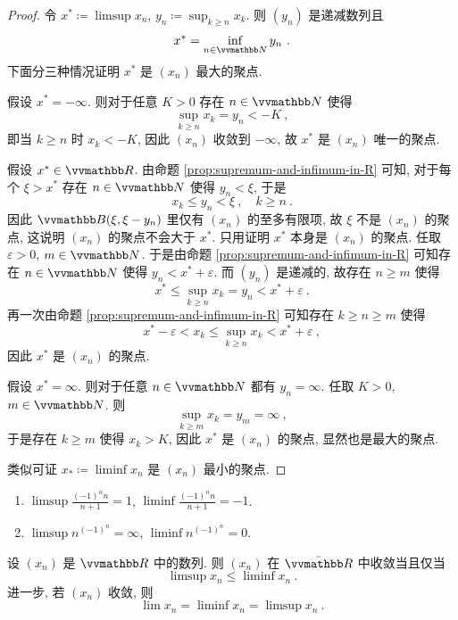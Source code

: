 \begin{proof}
    令 \(x^\ast \coloneqq \limsup x_n\), \(y_n \coloneqq \sup_{k \geq n} x_k\). 则 \((y_n)\) 是递减数列且
    \[
        x^\ast = \inf_{n \in \N} y_n\ .
    \]
    下面分三种情况证明 \(x^\ast\) 是 \((x_n)\) 最大的聚点.

    假设 \(x^\ast = - \infty\). 则对于任意 \(K > 0\) 存在 \(n \in \N\) 使得
    \[
        \sup_{k \geq n} x_k = y_n < - K\ ,
    \]
    即当 \(k \geq n\) 时 \(x_k < - K\), 因此 \((x_n)\) 收敛到 \(- \infty\), 故 \(x^\ast\) 是 \((x_n)\) 唯一的聚点.

    假设 \(x^\ast \in \R\). 由命题 \ref{prop:supremum-and-infimum-in-R} 可知, 对于每个 \(\xi > x^\ast\) 存在 \(n \in \N\) 使得 \(y_n < \xi\), 于是
    \[
        x_k \leq y_n < \xi\ ,\quad k \geq n\ .
    \]
    因此 \(\B(\xi, \xi - y_n)\) 里仅有 \((x_n)\) 的至多有限项, 故 \(\xi\) 不是 \((x_n)\) 的聚点, 这说明 \((x_n)\) 的聚点不会大于 \(x^\ast\). 只用证明 \(x^\ast\) 本身是 \((x_n)\) 的聚点. 任取 \(\varepsilon > 0\), \(m \in \N\). 于是由命题 \ref{prop:supremum-and-infimum-in-R} 可知存在 \(n \in \N\) 使得 \(y_n < x^\ast + \varepsilon\). 而 \((y_n)\) 是递减的, 故存在 \(n \geq m\) 使得
    \[
        x^\ast \leq \sup_{k \geq n} x_k = y_n < x^\ast + \varepsilon\ .
    \]
    再一次由命题 \ref{prop:supremum-and-infimum-in-R} 可知存在 \(k \geq n \geq m\) 使得
    \[
        x^\ast - \varepsilon < x_k \leq \sup_{k \geq n} x_k < x^\ast + \varepsilon\ ,
    \]
    因此 \(x^\ast\) 是 \((x_n)\) 的聚点.

    假设 \(x^\ast = \infty\). 则对于任意 \(n \in \N\) 都有 \(y_n = \infty\). 任取 \(K > 0\), \(m \in \N\). 则
    \[
        \sup_{k \geq m} x_k = y_m = \infty\ ,
    \]
    于是存在 \(k \geq m\) 使得 \(x_k > K\), 因此 \(x^\ast\) 是 \((x_n)\) 的聚点, 显然也是最大的聚点.

    类似可证 \(x_\ast \coloneqq \liminf x_n\) 是 \((x_n)\) 最小的聚点.
\end{proof}

\begin{example}
    \begin{enumerate}
        \item \(\displaystyle \limsup \frac{(- 1)^n n}{n + 1} = 1\), \(\displaystyle \liminf \frac{(- 1)^n n}{n + 1} = - 1\).
        \item \(\limsup n^{(- 1)^n} = \infty\), \(\liminf n^{(- 1)^n} = 0\).
    \end{enumerate}
\end{example}

\begin{theorem}\label{thm:limit-superior-and-inferior-with-limit}
    设 \((x_n)\) 是 \(\R\) 中的数列. 则 \((x_n)\) 在 \(\bar \R\) 中收敛当且仅当
    \[
        \limsup x_n \leq \liminf x_n\ .
    \]
    进一步, 若 \((x_n)\) 收敛, 则
    \[
        \lim x_n = \liminf x_n = \limsup x_n\ .
    \]
\end{theorem}

